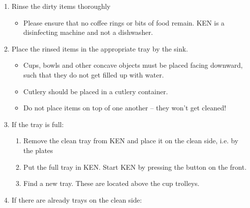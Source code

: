 

\begin{enumerate}
\bfseries \item Rinse the dirty items thoroughly \normalfont
\begin{itemize}

\item Please ensure that no coffee rings or bits of food remain. KEN is a
disinfecting machine and not a dishwasher.

\end{itemize}

\bfseries \item Place the rinsed items in the appropriate tray by the sink.
\normalfont

\begin{itemize}

\item Cups, bowls and other concave objects must be placed facing downward,
such that they do not get filled up with water.

\item Cutlery should be placed in a cutlery container.

\item Do not place items on top of one another -- they won't get cleaned!

\end{itemize}

\bfseries \item If the tray is full: \normalfont

\begin{enumerate}

\item Remove the clean tray from KEN and place it on the clean side, i.e. by
the plates

\item Put the full tray in KEN. Start KEN by pressing the button on the front.

\item Find a new tray. These are located above the cup trolleys.

\end{enumerate}

\bfseries \item If there are already trays on the clean side: \normalfont


\end{enumerate}
